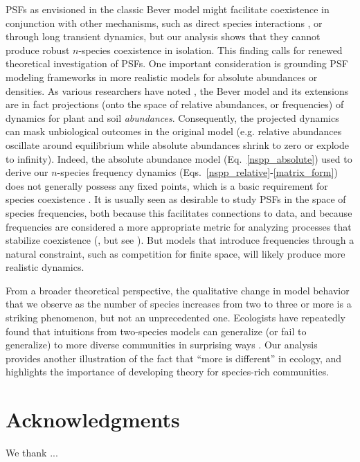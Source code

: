 \documentclass[11pt]{article}
\begin{document}
PSFs as envisioned in the classic Bever model might facilitate coexistence in conjunction with other mechanisms, such as direct species interactions \citep{bever2003soil}, or through long transient dynamics, but our analysis shows that they cannot produce robust $n$-species coexistence in isolation. This finding calls for renewed theoretical investigation of PSFs. One important consideration is grounding PSF modeling frameworks in more realistic models for absolute abundances or densities. As various researchers have noted \citep{kulmatiski2011testing,revilla2013plant,eppinga2018frequency,ke2020effects}, the Bever model and its extensions are in fact projections (onto the space of relative abundances, or frequencies) of dynamics for plant and soil \emph{abundances}. Consequently, the projected dynamics can mask unbiological outcomes in the original model (e.g. relative abundances oscillate around equilibrium while absolute abundances shrink to zero or explode to infinity). Indeed, the absolute abundance model (Eq.~\ref{nspp_absolute}) used to derive our $n$-species frequency dynamics (Eqs.~\ref{nspp_relative}-\ref{matrix_form}) does not generally possess any fixed points, which is a basic requirement for species coexistence \citep{hutson1990existence,hutson1992permanence}. It is usually seen as desirable to study PSFs in the space of species frequencies, both because this facilitates connections to data, and because frequencies are considered a more appropriate metric for analyzing processes that stabilize coexistence (\citet{adler2007niche,eppinga2018frequency}, but see \citet{kandlikar2019winning,ke2020effects}). But models that introduce frequencies through a natural constraint, such as competition for finite space, will likely produce more realistic dynamics.

From a broader theoretical perspective, the qualitative change in model behavior that we observe as the number of species increases from two to three or more is a striking phenomenon, but not an unprecedented one. Ecologists have repeatedly found that intuitions from two-species models can generalize (or fail to generalize) to more diverse communities in surprising ways \citep{strobeck1973n,smale1976differential,barabas2016effect}. Our analysis provides another illustration of the fact that ``more is different'' \citep{anderson1972more} in ecology, and highlights the importance of developing theory for species-rich communities.

\section*{Acknowledgments}
We thank ...



\end{document}
